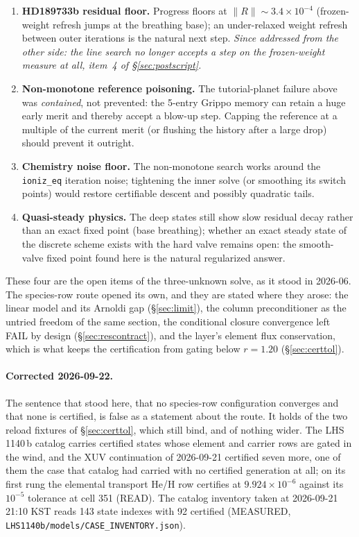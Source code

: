 \documentclass[english,a4paper]{my_memo}
\newcommand{\code}[1]{\texttt{#1}}
\begin{document}
\begin{enumerate}
\item \textbf{HD189733b residual floor.} Progress floors at
  $\|R\|\sim3.4\times10^{-4}$ (frozen-weight refresh jumps at the
  breathing base); an under-relaxed weight refresh between outer
  iterations is the natural next step. \emph{Since addressed from the other
  side: the line search no longer accepts a step on the frozen-weight measure
  at all, item~4 of \S\ref{sec:postscript}.}
\item \textbf{Non-monotone reference poisoning.} The tutorial-planet
  failure above was \emph{contained}, not prevented: the 5-entry Grippo
  memory can retain a huge early merit and thereby accept a blow-up step.
  Capping the reference at a multiple of the current merit (or flushing
  the history after a large drop) should prevent it outright.
\item \textbf{Chemistry noise floor.} The non-monotone search works around
  the \code{ioniz\_eq} iteration noise; tightening the inner solve (or
  smoothing its switch points) would restore certifiable descent and
  possibly quadratic tails.
\item \textbf{Quasi-steady physics.} The deep states still show slow
  residual decay rather than an exact fixed point (base breathing);
  whether an exact steady state of the discrete scheme exists with the
  hard valve remains open: the smooth-valve fixed point found here is
  the natural regularized answer.
\end{enumerate}

\noindent These four are the open items of the three-unknown solve, as it
stood in 2026-06. The species-row route opened its own, and they are stated
where they arose: the linear model and its Arnoldi gap
(\S\ref{sec:limit}), the column preconditioner as the untried freedom of the
same section, the conditional closure convergence left FAIL by design
(\S\ref{sec:rescontract}), and the layer's element flux conservation, which
is what keeps the certification from gating below $r = 1.20$
(\S\ref{sec:certtol}).

\paragraph{Corrected 2026-09-22.} The sentence that stood here, that no
species-row configuration converges and that none is certified, is false as a
statement about the route. It holds of the two reload fixtures of
\S\ref{sec:certtol}, which still bind, and of nothing wider. The
LHS\,1140\,b catalog carries certified states whose element and carrier rows
are gated in the wind, and the XUV continuation of 2026-09-21 certified seven
more, one of them the case that catalog had carried with no certified
generation at all; on its first rung the elemental transport He/H row
certifies at $9.924\times10^{-6}$ against its $10^{-5}$ tolerance at cell 351
(READ). The catalog
inventory taken at 2026-09-21 21:10 KST reads 143 state indexes with 92
certified (MEASURED, \code{LHS1140b/models/CASE\_INVENTORY.json}).
\end{document}
